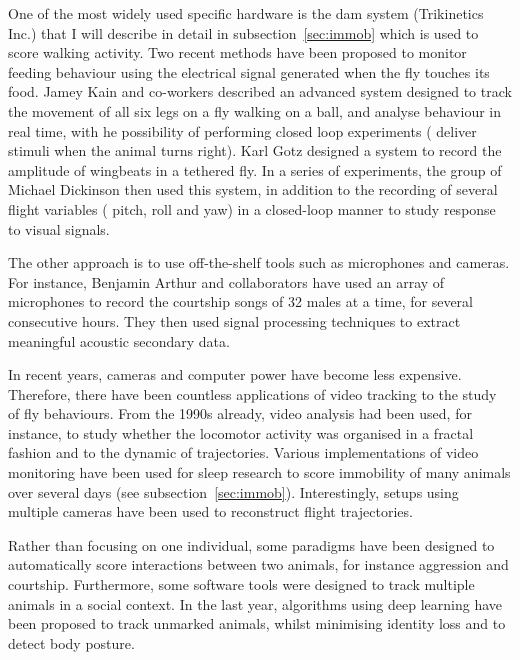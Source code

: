 One of the most widely used specific hardware is the \gls{dam} system (Trikinetics Inc.) that I will describe in detail in subsection~\ref{sec:immob} which is used to score walking activity.
Two recent methods have been proposed to monitor feeding behaviour using the electrical signal generated when the fly touches its food\cite{itskov_automated_2014,ro_flic_2014}.
Jamey Kain and co-workers described an advanced system designed to track the movement of all six legs on a fly walking on a ball, and analyse behaviour in real time, with he possibility of performing closed loop experiments (\eg{} deliver stimuli when the animal turns right)\cite{kain_leg-tracking_2013}.
Karl Gotz designed a system to record the amplitude of wingbeats in a tethered fly\cite{gotz_course-control_1987}.
In a series of experiments, the group of Michael Dickinson then used this system, in addition to the recording of several flight variables (\eg{} pitch, roll and yaw) in a closed-loop manner to study response to visual signals\cite{sherman_comparison_2003,maimon_simple_2008}.

The other approach is to use off-the-shelf tools such as microphones and cameras.
For instance, Benjamin Arthur and collaborators have used an array of microphones to record the courtship songs of 32 males at a time, for several consecutive hours\cite{arthur_multi-channel_2013}. They then used signal processing techniques to extract meaningful acoustic secondary data.

In recent years, cameras and computer power have become less expensive.
Therefore, there have been countless applications of video tracking to the study of fly behaviours.
From the 1990s already, video analysis had been used, for instance, to study whether the locomotor activity
was organised in a fractal fashion\cite{cole_fractal_1995} and to the dynamic of trajectories\cite{martin_portrait_2004}.
Various implementations of video monitoring have been used for sleep research 
to score immobility of many animals over several days\cite{zimmerman_video_2008,gilestro_video_2012, donelson_high-resolution_2012,faville_how_2015} (see subsection~\ref{sec:immob}).
Interestingly, setups using multiple cameras have been used to reconstruct flight trajectories\cite{straw_multi-camera_2010}.

Rather than focusing on one individual, some paradigms have been designed to automatically score interactions between two animals,
for instance aggression\cite{dankert_automated_2009} and courtship\cite{tsai_image_2012}.
Furthermore, some software tools were designed to track multiple animals in a social context\cite{branson_high-throughput_2009,perez-escudero_idtracker_2014,kabra_jaaba_2013,robie_mapping_2017}.
In the last year, algorithms using deep learning have been proposed to track unmarked animals, whilst minimising identity loss\cite{romero-ferrero_idtracker.ai_2018} and to detect body posture\cite{pereira_fast_2018}.

